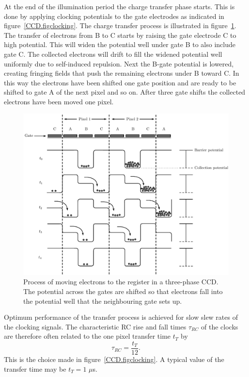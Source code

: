 At the end of the illumination period the charge transfer phase
starts. This is done by applying clocking potentials to the gate
electrodes as indicated in figure~\ref{CCD.figclocking}. The charge
transfer process is illustrated in figure~\ref{fig:ccd-shifting-potential}.
The transfer
of electrons from B to C starts by raising the gate electrode C to
high potential. This will widen the potential well under gate B to
also include gate C. The collected electrons will drift to fill the
widened potential well uniformly due to self-induced repulsion. Next
the B-gate potential is lowered, creating fringing fields that push
the remaining electrons under B toward C. In this way the electrons
have been shifted one gate position and are ready to be shifted to
gate A of the next pixel and so on. After three gate shifts the
collected electrons have been moved one pixel.
%
\begin{figure}[htpb]
	\centering
	\includegraphics[width=\textwidth]{ccd-shifting-potential.pdf}
	\caption{Process of moving electrons to the register in a three-phase CCD. The potential across the gates
	are shifted so that electrons fall into the potential well that the neighbouring gate
	sets up.}
	\label{fig:ccd-shifting-potential}
\end{figure}

Optimum performance of the transfer process is achieved for slow slew
rates of the clocking signals. The characteristic RC rise and fall times
 $\tau_{RC}$ of the clocks are therefore often related to the one pixel
transfer time $t_T$ by
\begin{equation}
  \tau_{RC} = \frac{t_T}{12}.
\end{equation}
This is the choice made in figure~\ref{CCD.figclocking}. A typical
value of the transfer time may be $t_T = 1$ $\mu$s.

